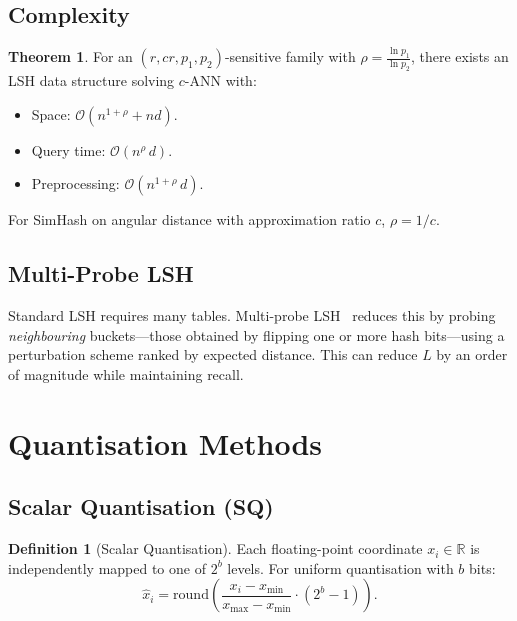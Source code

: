 \documentclass[11pt,a4paper]{article}
\theoremstyle{definition}
\newtheorem{definition}{Definition}[section]
\newtheorem{theorem}{Theorem}[section]
\newcommand{\R}{\mathbb{R}}
\newcommand{\calO}{\mathcal{O}}
\begin{document}
\subsection{Complexity}

\begin{theorem}
For an $(r, cr, p_1, p_2)$-sensitive family with $\rho = \frac{\ln
p_1}{\ln p_2}$, there exists an LSH data structure solving $c$-ANN with:
\begin{itemize}[nosep]
  \item Space: $\calO(n^{1+\rho} + nd)$.
  \item Query time: $\calO(n^{\rho}\,d)$.
  \item Preprocessing: $\calO(n^{1+\rho}\,d)$.
\end{itemize}
\end{theorem}

For SimHash on angular distance with approximation ratio $c$,
$\rho = 1/c$.

\subsection{Multi-Probe LSH}

Standard LSH requires many tables.  Multi-probe LSH~\cite{lv2007multiprobe} reduces this by
probing \emph{neighbouring} buckets---those obtained by flipping one or
more hash bits---using a perturbation scheme ranked by expected distance.
This can reduce $L$ by an order of magnitude while maintaining recall.


\section{Quantisation Methods}\label{sec:quant}

\subsection{Scalar Quantisation (SQ)}

\begin{definition}[Scalar Quantisation]
Each floating-point coordinate $x_i \in \R$ is independently mapped to
one of $2^b$ levels.  For uniform quantisation with $b$ bits:
\[
  \hat{x}_i = \mathrm{round}\!\left(
    \frac{x_i - x_{\min}}{x_{\max} - x_{\min}} \cdot (2^b - 1)
  \right).
\]
\end{definition}
\end{document}
